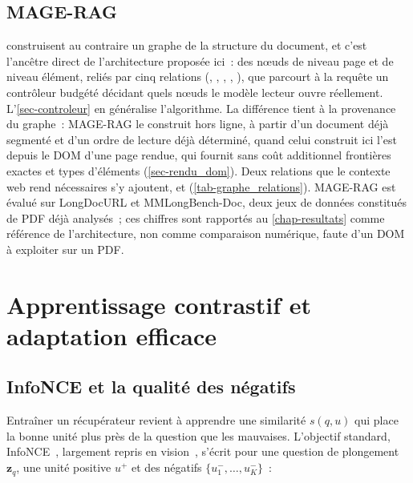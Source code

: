 \subsection{MAGE-RAG}
\label{sec-eda_magerag}

\citet{magerag2026} construisent au contraire un graphe de la structure
du document, et c'est l'ancêtre direct de l'architecture proposée ici~: des
nœuds de niveau page et de niveau élément, reliés par cinq relations
(, , ,
, ), que parcourt à la
requête un contrôleur budgété décidant quels nœuds le modèle lecteur ouvre
réellement. L'\cref{sec-controleur} en généralise l'algorithme. La
différence tient à la provenance du graphe~: MAGE-RAG le construit hors ligne,
à partir d'un document déjà segmenté et d'un ordre de lecture déjà
déterminé, quand celui construit ici l'est depuis le DOM d'une page rendue, qui
fournit sans coût additionnel frontières exactes et types d'éléments
(\cref{sec-rendu_dom}). Deux relations que le contexte web rend
nécessaires s'y ajoutent,  et 
(\cref{tab-graphe_relations}). MAGE-RAG est évalué sur LongDocURL et
MMLongBench-Doc, deux jeux de données constitués de PDF déjà analysés~; ces
chiffres sont rapportés au \cref{chap-resultats} comme référence de
l'architecture, non comme comparaison numérique, faute d'un DOM à exploiter
sur un PDF.

\section{Apprentissage contrastif et adaptation efficace}
\label{sec-eda_contrastif}

\subsection{InfoNCE et la qualité des négatifs}
\label{sec-eda_contrastif_infonce}

Entraîner un récupérateur revient à apprendre une similarité $s(q,u)$ qui
place la bonne unité plus près de la question que les mauvaises. L'objectif
standard, InfoNCE~\citep{cpc2018}, largement repris en vision~\citep{simclr2020},
s'écrit pour une question de plongement $\mathbf{z}_q$, une unité positive
$u^+$ et des négatifs $\{u_1^-,\dots,u_K^-\}$~:

